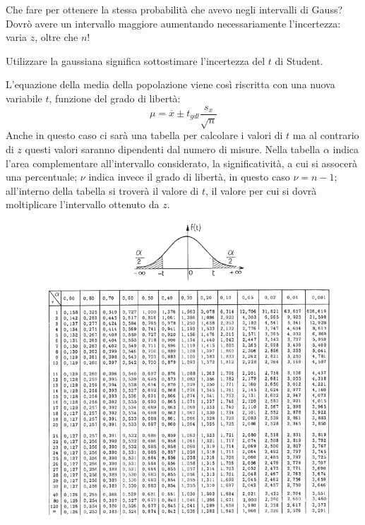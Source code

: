 \documentclass[a4paper, 15pt]{article}
\begin{document}
\begin{adjustwidth}{2in}{}
	Che fare per ottenere la stessa probabilità che avevo negli intervalli di Gauss? Dovrò avere un intervallo maggiore aumentando necessariamente l'incertezza: varia $z$, oltre che $n$!
	
	Utilizzare la gaussiana significa sottostimare l'incertezza del $t$ di Student.\newline 
	
	L'equazione della media della popolazione viene così riscritta con una nuova variabile $t$, funzione del grado di libertà:
	\[\mu = \overline{x} \pm t_{gdl}\dfrac{s_x}{\sqrt{n}}\]
	Anche in questo caso ci sarà una tabella per calcolare i valori di $t$ ma al contrario di $z$ questi valori saranno dipendenti dal numero di misure.  
\newpage	
	Nella tabella $\alpha$ indica l'area complementare all'intervallo considerato, la significatività, a cui si assocerà una percentuale; $\nu$ indica invece il grado di libertà, in questo caso $\nu = n-1$; all'interno della tabella si troverà il valore di $t$, il valore per cui si dovrà moltiplicare l'intervallo ottenuto da $z$. 	
	\begin{figure}[H]
		\centering
		\includegraphics[width=0.7\linewidth]{fig/screenshot010}
		\label{fig:screenshot010}
	\end{figure}
\end{adjustwidth}
\end{document}
